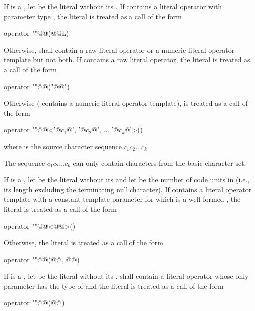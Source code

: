 \pnum
If  is a , let  be the
literal without its . If  contains a literal operator
with parameter type , the literal  is treated as a call of
the form
\begin{codeblock}
operator ""@@(@@L)
\end{codeblock}
Otherwise,  shall contain a raw literal operator
or a numeric literal operator template but not both.
If  contains a raw literal operator,
the literal  is treated as a call of the form
\begin{codeblock}
operator ""@@("@@")
\end{codeblock}
Otherwise ( contains a numeric literal operator template),
 is treated as a call of the form
\begin{codeblock}
operator ""@@<'@$c_1$@', '@$c_2$@', ... '@$c_k$@'>()
\end{codeblock}
where  is the source character sequence $c_1c_2...c_k$.
\begin{note}
The sequence
$c_1c_2...c_k$ can only contain characters from the basic character set.
\end{note}

\pnum
If  is a ,
let  be the literal without its 
and let  be the number of code units in 
(i.e., its length excluding the terminating null character).
If  contains a literal operator template with
a constant template parameter for which  is
a well-formed ,
the literal  is treated as a call of the form
\begin{codeblock}
operator ""@@<@@>()
\end{codeblock}
Otherwise, the literal  is treated as a call of the form
\begin{codeblock}
operator ""@@(@@, @@)
\end{codeblock}

\pnum
If  is a , let  be the
literal without its .
 shall contain a literal operator whose only parameter has
the type of  and the
literal  is treated as a call
of the form
\begin{codeblock}
operator ""@@(@@)
\end{codeblock}

